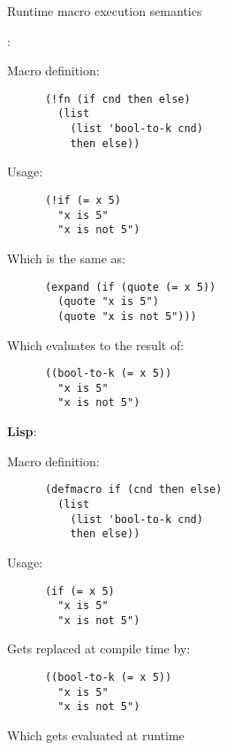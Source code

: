 \begin{frame}[fragile]{Runtime macro execution semantics}
  \begin{minipage}[t]{0.48\textwidth}
    \textbf{\lang}:

    \vspace{0.5em}
    Macro definition:
    \begin{verbatim}
      (!fn (if cnd then else)
        (list
          (list 'bool-to-k cnd)
          then else))
    \end{verbatim}
    \vspace{0.5em}
    Usage:
    \begin{verbatim}
      (!if (= x 5)
        "x is 5"
        "x is not 5")
    \end{verbatim}
    \vspace{0.5em}
    Which is the same as:
    \begin{verbatim}
      (expand (if (quote (= x 5))
        (quote "x is 5")
        (quote "x is not 5")))
    \end{verbatim}
    \vspace{0.5em}
    Which evaluates to the result of:
    \begin{verbatim}
      ((bool-to-k (= x 5))
        "x is 5"
        "x is not 5")
    \end{verbatim}
  \end{minipage}
  \begin{minipage}[t]{0.48\textwidth}
    \textbf{Lisp}:

    \vspace{0.5em}
    Macro definition:
    \begin{verbatim}
      (defmacro if (cnd then else)
        (list
          (list 'bool-to-k cnd)
          then else))
    \end{verbatim}

    \vspace{0.5em}
    Usage:
    \begin{verbatim}
      (if (= x 5)
        "x is 5"
        "x is not 5")
    \end{verbatim}

    \vspace{0.5em}
    Gets replaced at compile time by:
    \begin{verbatim}
      ((bool-to-k (= x 5))
        "x is 5"
        "x is not 5")
    \end{verbatim}

    \vspace{0.5em}
    Which gets evaluated at runtime
  \end{minipage}
\end{frame}

